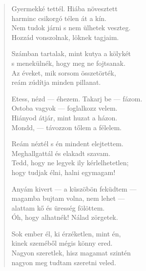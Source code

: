 \documentclass[11pt]{extbook}
\newcommand*{\centeredornament}{\centerline{\pgfornament[width=6cm]{88}}}
\begin{document}
\newpage

\vspace*{-15mm}
\centeredornament



\begin{verse}
  Gyermekké tettél. Hiába növesztett \\
  harminc csikorgó télen át a kín. \\
  Nem tudok járni s nem ülhetek veszteg. \\
  Hozzád vonszolnak, löknek tagjaim.

  Számban tartalak, mint kutya a kölykét \\
  s menekülnék, hogy meg ne fojtsanak. \\
  Az éveket, mik sorsom összetörték, \\
  reám zúdítja minden pillanat.

  Etess, nézd --- éhezem. Takarj be --- fázom. \\
  Ostoba vagyok --- foglalkozz velem. \\
  Hiányod átjár, mint huzat a házon. \\
  Mondd, --- távozzon tőlem a félelem.

  Reám néztél s én mindent elejtettem. \\
  Meghallgattál és elakadt szavam. \\
  Tedd, hogy ne legyek ily kérlelhetetlen; \\
  hogy tudjak élni, halni egymagam!

  Anyám kivert --- a küszöbön feküdtem --- \\
  magamba bujtam volna, nem lehet --- \\
  alattam kő és üresség fölöttem. \\
  Óh, hogy alhatnék! Nálad zörgetek.

  Sok ember él, ki érzéketlen, mint én, \\
  kinek szeméből mégis könny ered. \\
  Nagyon szeretlek, hisz magamat szintén \\
  nagyon meg tudtam szeretni veled.
\end{verse}

\newpage


\vspace*{-15mm}
\centeredornament
\end{document}

